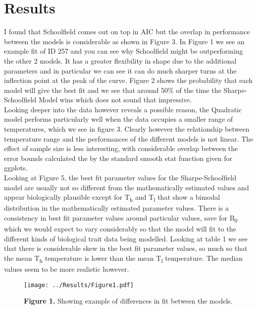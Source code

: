 \documentclass[fontsize=11pt]{scrartcl}\usepackage[]{graphicx}\usepackage[]{color}
\begin{document}
  \section{Results}
  I found that Schoolfield comes out on top in AIC but the overlap in performance between the models is considerable as shown in Figure 3. 
  In Figure 1 we see an example fit of ID 257 and you can see why Schoolfield 
  might be outperforming the other 2 models. It has a greater flexibility in shape due to the 
  additional parameters and in particular we can see it can do much sharper turns at the inflection point at 
  the peak of the curve. Figure 2 shows the probability that each model will give the best fit and we see that around 50\% of the time
  the Sharpe-Schoolfield Model wins which does not sound that impressive. \\
  Looking deeper into the data however reveals a possible reason, the Quadratic model performs particularly well when the data 
  occupies a smaller range of temperatures, which we see in figure 3. Clearly however the relationship between temperature range and
  the performances of the different models is not linear. The effect of sample size is less interesting, with considerable overlap between the
  error bounds calculated the by the standard smooth stat function given for ggplots. 
   \\
  Looking at Figure 5, the best fit parameter values for 
  the Sharpe-Schoolfield model are usually not so different from the 
  mathematically estimated values and appear biologically plausible except for T\textsubscript{h} and T\textsubscript{l} 
  that show a bimodal distribution in the mathematically estimated parameter values. There is a consistency in best fit parameter values 
  around particular values, save for B\textsubscript{0} which we would expect to vary considerably so that the model will fit to 
  the different kinds of biological trait data being modelled. Looking at table 1 we see that there is considerable skew in 
  the best fit parameter values, so much so that the mean T\textsubscript{h} temperature is lower than the mean T\textsubscript{l} 
  temperature. The median values seem to be more realistic however.
  
  \begin{figure}[h]
    \texttt{[image: ../Results/Figure1.pdf]}
    \begin{center}
    \textbf{Figure 1.} Showing example of differences in fit between the models.
    \end{center}
  \end{figure}
\end{document}
